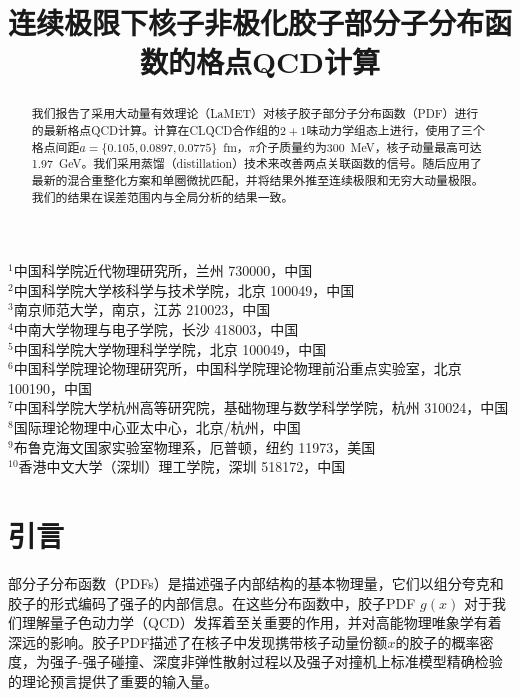 \documentclass[12pt,a4paper]{ctexart}
\title{\heiti 连续极限下核子非极化胶子部分子分布函数的格点QCD计算}
\author{
    Chen Chen$^{1,2}$,\quad Hongxin Dong$^{1,3}$,\quad Liuming Liu$^{1,2,*}$,\quad
    Peng Sun$^{1,2,\dagger}$,\quad Xiaonu Xiong$^{4}$,\\[3pt]
    Yi-Bo Yang$^{5,6,7,8,\ddagger}$,\quad Fei Yao$^{9}$,\quad
    Jian-Hui Zhang$^{10,\S}$,\quad Chunhua Zeng$^{1,2}$,\quad Shiyi Zhong$^{10}
}
\date{}
\begin{document}
\maketitle

\begin{center}
\small
$^{1}$中国科学院近代物理研究所，兰州 730000，中国\\
$^{2}$中国科学院大学核科学与技术学院，北京 100049，中国\\
$^{3}$南京师范大学，南京，江苏 210023，中国\\
$^{4}$中南大学物理与电子学院，长沙 418003，中国\\
$^{5}$中国科学院大学物理科学学院，北京 100049，中国\\
$^{6}$中国科学院理论物理研究所，中国科学院理论物理前沿重点实验室，北京 100190，中国\\
$^{7}$中国科学院大学杭州高等研究院，基础物理与数学科学学院，杭州 310024，中国\\
$^{8}$国际理论物理中心亚太中心，北京/杭州，中国\\
$^{9}$布鲁克海文国家实验室物理系，厄普顿，纽约 11973，美国\\
$^{10}$香港中文大学（深圳）理工学院，深圳 518172，中国
\end{center}

\vspace{5pt}

\begin{abstract}
\noindent
我们报告了采用大动量有效理论（LaMET）对核子胶子部分子分布函数（PDF）进行的最新格点QCD计算。计算在CLQCD合作组的$2+1$味动力学组态上进行，使用了三个格点间距$a = \{0.105, 0.0897, 0.0775\}$~fm，$\pi$介子质量约为300~MeV，核子动量最高可达1.97~GeV。我们采用蒸馏（distillation）技术来改善两点关联函数的信号。随后应用了最新的混合重整化方案和单圈微扰匹配，并将结果外推至连续极限和无穷大动量极限。我们的结果在误差范围内与全局分析的结果一致。
\end{abstract}

\section{引言}

部分子分布函数（PDFs）是描述强子内部结构的基本物理量，它们以组分夸克和胶子的形式编码了强子的内部信息。在这些分布函数中，胶子PDF $g(x)$ 对于我们理解量子色动力学（QCD）发挥着至关重要的作用，并对高能物理唯象学有着深远的影响。胶子PDF描述了在核子中发现携带核子动量份额$x$的胶子的概率密度，为强子-强子碰撞、深度非弹性散射过程以及强子对撞机上标准模型精确检验的理论预言提供了重要的输入量。
\end{document}
